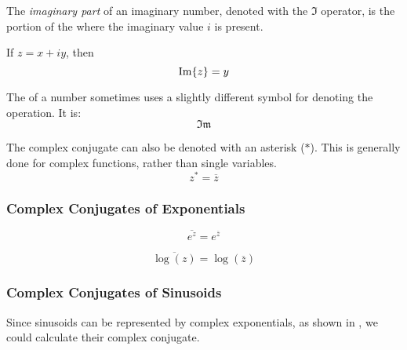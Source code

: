 \begin{definition}\label{def:Imaginary_Part}
  The \emph{imaginary part} of an imaginary number, denoted with the $\Im$ operator, is the portion of the  where the imaginary value $i$ is present.

  If $z = x + iy$, then
  \begin{equation}\label{eq:Imaginary_Part}
    \operatorname{Im} \lbrace z \rbrace = y
  \end{equation}

  \begin{remark}\label{rmk:Imaginary_Part_Alternative_Notation}
    The  of a number sometimes uses a slightly different symbol for denoting the operation.
    It is:
    \begin{equation*}
      \mathfrak{Im}
    \end{equation*}
  \end{remark}
\end{definition}

The complex conjugate can also be denoted with an asterisk ($*$).
This is generally done for complex functions, rather than single variables.
\begin{equation}\label{eq:Complex_Conjugates_Asterisk}
  z^{*} = \overline{z}
\end{equation}

\subsubsection{Complex Conjugates of Exponentials}\label{app:Exponential_Complex_Conjugates}
\begin{equation}\label{eq:Exponential_Complex_Conjugates-e}
  \overline{e^{z}} = e^{\overline{z}}
\end{equation}

\begin{equation}\label{eq:Exponential_Complex_Conjugates-log}
  \overline{\log(z)} = \log(\overline{z})
\end{equation}

\subsubsection{Complex Conjugates of Sinusoids}\label{app:Sinusoid_Complex_Conjugates}
Since sinusoids can be represented by complex exponentials, as shown in , we could calculate their complex conjugate.


